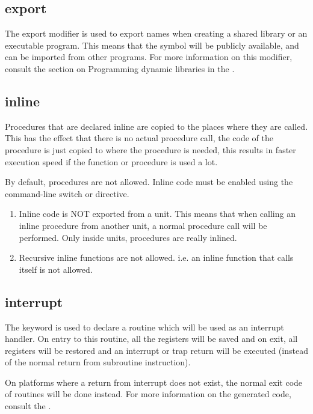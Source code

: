 \subsection{export}
The export modifier is used to export names when creating a shared library
or an executable program. This means that the symbol will be publicly
available, and can be imported from other programs. For more information
on this modifier, consult the section on Programming dynamic libraries
in the \progref.


\subsection{inline}
\label{se:inline}
Procedures that are declared inline are copied to the places where they
are called. This has the effect that there is no actual procedure call,
the code of the procedure is just copied to where the procedure is needed,
this results in faster execution speed if the function or procedure is
used a lot.

By default,  procedures are not allowed. Inline code must be enabled
using the command-line switch  or 
directive.


\begin{enumerate}
\item Inline code is NOT exported from a unit. This means that when
calling an inline procedure from another unit, a normal procedure call will be
performed. Only inside units,  procedures are really inlined.
\item Recursive inline functions are not allowed. i.e. an inline function
that calls itself is not allowed.
\end{enumerate}

\subsection{interrupt}
\label{se:interrupt}
The  keyword is used to declare a routine which will
be used as an interrupt handler. On entry to this routine, all the registers
will be saved and on exit, all registers will be restored
and an interrupt or trap return will be executed (instead of the normal return
from subroutine instruction).

On platforms where a return from interrupt does not exist, the normal exit
code of routines will be done instead. For more information on the generated
code, consult the \progref.

